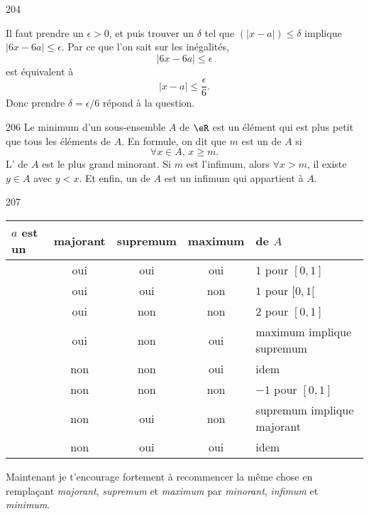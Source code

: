 \documentclass{article}
\begin{document}
\begin{corrige}{204}

Il faut prendre un $\epsilon>0$, et puis trouver un $\delta$ tel que $(| x- a |)\leq\delta$ implique $ | 6x-6a |\leq\epsilon$. Par ce que l'on sait sur les inégalités, 
\[ 
  | 6x-6a |\leq\epsilon
\]
 est équivalent à
\[ 
  | x-a |\leq \frac{ \epsilon }{ 6 }.
\]
Donc prendre $\delta=\epsilon/6$ répond à la question.

\end{corrige}


\begin{corrige}{206}
Le minimum d'un sous-ensemble $A$ de $\eR$ est un élément qui est plus petit que tous les éléments de $A$. En formule, on dit que $m$ est un  de $A$ si 
\[ 
  \forall x\in A,\,x\geq m.
\]
L' de $A$ est le plus grand minorant. Si $m$ est l'infimum, alors $\forall x>m$, il existe $y\in A$ avec $y<x$. Et enfin, un  de $A$ est un infimum qui appartient à $A$.
\end{corrige}
\begin{corrige}{207}


\begin{center}
\begin{tabular}{l|c|c|c|l}
$a$ est un	&	majorant&	supremum	&	maximum	& de $A$\\\hline
		&	oui	&	oui		&	oui	&	$1$ pour $[0,1]$	\\ 
		&	oui	&	oui		&	non	&	$1$ pour $[0,1[$	\\ 
		&	oui	&	non		&	non	&	$2$ pour $[0,1]$	\\ 
		&	oui	&	non		&	oui	&	maximum implique supremum	\\ 
		&	non	&	non		&	oui	&	idem	\\ 
		&	non	&	non		&	non	&	$-1$ pour $[0,1]$	\\ 
		&	non	&	oui		&	non	&	supremum implique majorant	\\ 
		&	non	&	oui		&	oui	&	idem	\\ 
\end{tabular}
\end{center}
Maintenant je t'encourage fortement à recommencer la même chose en remplaçant \emph{majorant}, \emph{supremum} et \emph{maximum} par \emph{minorant}, \emph{infimum} et \emph{minimum}.
\end{corrige}
\end{document}
